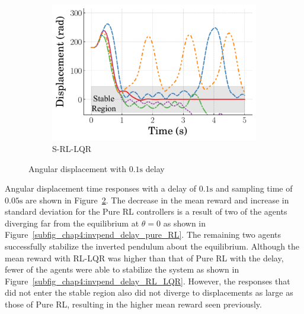 \begin{figure}[tb]
\begin{subfigure}[b]{0.49\textwidth}
        \centering
        \includegraphics[width=\textwidth]{figures/figures_robustness/invpend_robustness/Angular_displacement_DELAY_2_switch_LQR.pdf}
        \caption{S-RL-LQR}
        \label{subfig_chap4:invpend_delay_S_RL_LQR}
    \end{subfigure}
    \caption{Angular displacement with $0.1\si{\second}$ delay}
    \label{fig_chap4:invpend_delay}
  \end{figure}
Angular displacement time responses with a delay of $0.1\si{\second}$ and sampling time of $0.05\si{\second}$ are shown in Figure~\ref{fig_chap4:invpend_delay}.
The decrease in the mean reward and increase in standard deviation for the Pure RL controllers is a result of two of the agents diverging far from the equilibrium at $\theta=0$ as shown in Figure~\ref{subfig_chap4:invpend_delay_pure_RL}.
%
The remaining two agents successfully stabilize the inverted pendulum about the equilibrium.
%
%
Although the mean reward with RL-LQR was higher than that of Pure RL with the delay, fewer of the agents were able to stabilize the system as shown in Figure~\ref{subfig_chap4:invpend_delay_RL_LQR}. However, the responses that did not enter the stable region also did not diverge to displacements as large as those of Pure RL, resulting in the higher mean reward seen previously.
